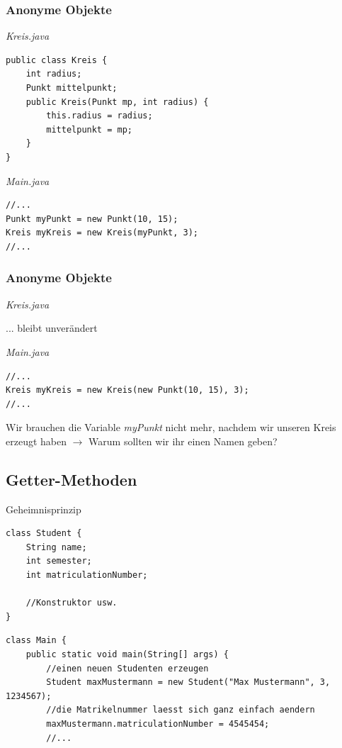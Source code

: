 \documentclass[18pt]{beamer}
\begin{document}

\begin{frame}[containsverbatim]
	\frametitle{Anonyme Objekte}
	
	\emph{Kreis.java}
	\begin{lstlisting}
public class Kreis {
	int radius;
	Punkt mittelpunkt;
	public Kreis(Punkt mp, int radius) {
		this.radius = radius;
		mittelpunkt = mp;
	}
}
		\end{lstlisting}
	
		\emph{Main.java}
		\begin{lstlisting}
//...
Punkt myPunkt = new Punkt(10, 15);
Kreis myKreis = new Kreis(myPunkt, 3);
//...
		\end{lstlisting}
\end{frame}


\begin{frame}[containsverbatim]
	\frametitle{Anonyme Objekte}
	\emph{Kreis.java}
		
	... bleibt unverändert	
	
	
	
		\emph{Main.java}
		\begin{lstlisting}
//...
Kreis myKreis = new Kreis(new Punkt(10, 15), 3);
//...
		\end{lstlisting}
		
		Wir brauchen die Variable \emph{myPunkt} nicht mehr, nachdem wir unseren Kreis erzeugt haben $\rightarrow$ Warum sollten wir ihr einen Namen geben?
\end{frame}


\subsection{Getter-Methoden}
\begin{frame}[containsverbatim]{Geheimnisprinzip}
\begin{lstlisting}
class Student {
	String name;
	int semester;
	int matriculationNumber;
	
	//Konstruktor usw.
}
\end{lstlisting}
\begin{lstlisting}
class Main {
	public static void main(String[] args) {
		//einen neuen Studenten erzeugen
		Student maxMustermann = new Student("Max Mustermann", 3, 1234567);
		//die Matrikelnummer laesst sich ganz einfach aendern
		maxMustermann.matriculationNumber = 4545454;
		//...
\end{lstlisting}
\ \\ \ \\
\end{frame}
\end{document}
